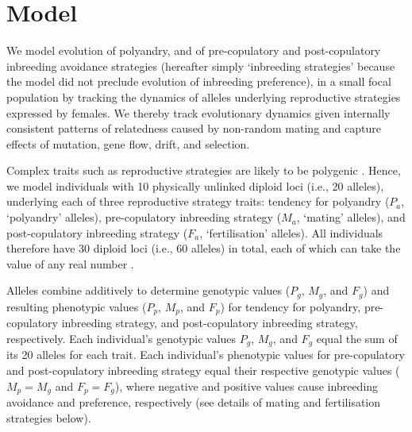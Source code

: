 \documentclass[12pt]{article}
\begin{document}
\section*{Model}

We model evolution of polyandry, and of pre-copulatory and post-copulatory inbreeding avoidance strategies (hereafter simply `inbreeding strategies' because the model did not preclude evolution of inbreeding preference), in a small focal population by tracking the dynamics of alleles underlying reproductive strategies expressed by females. We thereby track evolutionary dynamics given internally consistent patterns of relatedness caused by non-random mating and capture effects of mutation, gene flow, drift, and selection. 

Complex traits such as reproductive strategies are likely to be polygenic \cite[][]{Evans2008}. Hence, we model individuals with 10 physically unlinked diploid loci (i.e., 20 alleles), underlying each of three reproductive strategy traits: tendency for polyandry ($P_{a}$, `polyandry' alleles), pre-copulatory inbreeding strategy ($M_{a}$, `mating' alleles), and post-copulatory inbreeding strategy ($F_{a}$, `fertilisation' alleles). All individuals therefore have 30 diploid loci (i.e., 60 alleles) in total, each of which can take the value of any real number \cite[continuum-of-alleles model;][]{Kimura1965, Lande1976, Reeve2000, Bocedi2014}.

Alleles combine additively to determine genotypic values ($P_{g}$, $M_{g}$, and $F_{g}$) and resulting phenotypic values ($P_{p}$, $M_{p}$, and $F_{p}$) for tendency for polyandry, pre-copulatory inbreeding strategy, and post-copulatory inbreeding strategy, respectively. Each individual's genotypic values $P_{g}$, $M_{g}$, and $F_{g}$ equal the sum of its 20 alleles for each trait. Each individual's phenotypic values for pre-copulatory and post-copulatory inbreeding strategy equal their respective genotypic values ($M_{p} = M_{g}$ and $F_{p} = F_{g}$), where negative and positive values cause inbreeding avoidance and preference, respectively (see details of mating and fertilisation strategies below). 
\end{document}
